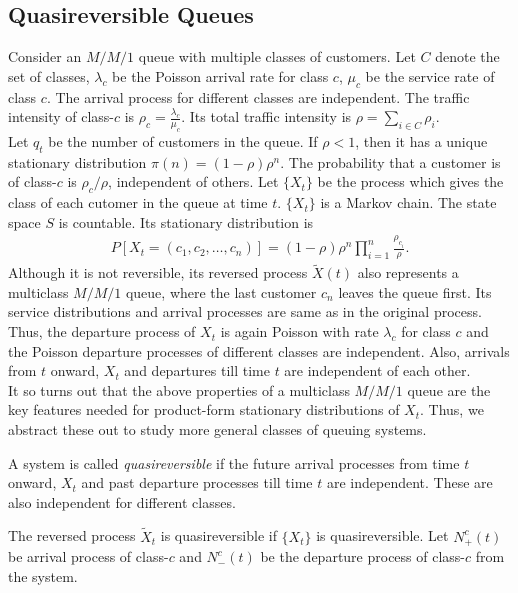 \documentclass[all-lectures.tex]{subfiles}
\begin{document}
\subsection{Quasireversible Queues}
\indent Consider an $M/M/1$ queue with multiple classes of customers. Let $C$ denote the set of classes, $\lambda_c$ be the Poisson arrival rate for class $c$, $\mu_c$ be the service rate of class $c$. The arrival process for different classes are independent. The traffic intensity of class-$c$ is $\rho_c = \frac{\lambda_c}{\mu_c}$. Its total traffic intensity is $\rho = \sum_{i \in C} \rho_i$. \\
\indent Let $q_t$ be the number of customers in the queue. If $\rho < 1$, then it has a unique stationary distribution $\pi(n) = (1-\rho) \rho^n$. The probability that a customer is of class-$c$ is ${\rho_c}/{\rho}$, independent of others. Let $\{X_t\}$ be the process which gives the class of each cutomer in the queue at time $t$. $\{X_t\}$ is a Markov  chain. The state space $S$ is countable. Its stationary distribution is 
\begin{align}\label{eq:prod_form_nets_multiclass}
P[X_t = (c_1, c_2, \dots, c_n)] = (1-\rho) \rho^n \prod_{i=1}^{n} \frac{\rho_{c_i}}{\rho}.
\end{align}
Although it is not reversible, its reversed process $\tilde{X}(t)$ also represents a multiclass $M/M/1$ queue, where the last customer $c_n$ leaves the queue first. Its service distributions and arrival processes are same as in the original process. Thus, the departure process of $X_t$ is again Poisson with rate $\lambda_c$ for class $c$ and the Poisson departure processes of different classes are independent. Also, arrivals from $t$ onward, $X_t$ and departures till time $t$ are independent of each other. \\
\indent It so turns out that the above properties of a multiclass $M/M/1$ queue are the key features needed for product-form stationary distributions of $X_t$.  Thus, we abstract these out to study more general classes of queuing systems.
\begin{defn}
A system is called \textit{quasireversible }if the future arrival processes from time $t$ onward, $X_t$ and past departure processes till time $t$ are independent. These are also independent for different classes.
\end{defn}
\indent The reversed process $\tilde{X}_t$ is quasireversible if $\{X_t\}$ is quasireversible. Let $N_+^c (t)$ be arrival process of class-$c$ and $N_-^c (t)$ be the departure process of class-$c$ from the system.
\end{document}
